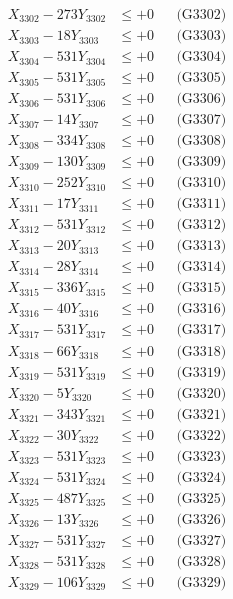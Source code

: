 \documentclass[a4paper,10pt]{article}
\begin{document}
{\begin{align}
X_{3302} - 273Y_{3302} &\leq +0 && \text{(G3302)} \\
X_{3303} - 18Y_{3303} &\leq +0 && \text{(G3303)} \\
X_{3304} - 531Y_{3304} &\leq +0 && \text{(G3304)} \\
X_{3305} - 531Y_{3305} &\leq +0 && \text{(G3305)} \\
X_{3306} - 531Y_{3306} &\leq +0 && \text{(G3306)} \\
X_{3307} - 14Y_{3307} &\leq +0 && \text{(G3307)} \\
X_{3308} - 334Y_{3308} &\leq +0 && \text{(G3308)} \\
X_{3309} - 130Y_{3309} &\leq +0 && \text{(G3309)} \\
X_{3310} - 252Y_{3310} &\leq +0 && \text{(G3310)} \\
\allowbreak
X_{3311} - 17Y_{3311} &\leq +0 && \text{(G3311)} \\
X_{3312} - 531Y_{3312} &\leq +0 && \text{(G3312)} \\
X_{3313} - 20Y_{3313} &\leq +0 && \text{(G3313)} \\
X_{3314} - 28Y_{3314} &\leq +0 && \text{(G3314)} \\
X_{3315} - 336Y_{3315} &\leq +0 && \text{(G3315)} \\
X_{3316} - 40Y_{3316} &\leq +0 && \text{(G3316)} \\
X_{3317} - 531Y_{3317} &\leq +0 && \text{(G3317)} \\
X_{3318} - 66Y_{3318} &\leq +0 && \text{(G3318)} \\
X_{3319} - 531Y_{3319} &\leq +0 && \text{(G3319)} \\
X_{3320} - 5Y_{3320} &\leq +0 && \text{(G3320)} \\
\allowbreak
X_{3321} - 343Y_{3321} &\leq +0 && \text{(G3321)} \\
X_{3322} - 30Y_{3322} &\leq +0 && \text{(G3322)} \\
X_{3323} - 531Y_{3323} &\leq +0 && \text{(G3323)} \\
X_{3324} - 531Y_{3324} &\leq +0 && \text{(G3324)} \\
X_{3325} - 487Y_{3325} &\leq +0 && \text{(G3325)} \\
X_{3326} - 13Y_{3326} &\leq +0 && \text{(G3326)} \\
X_{3327} - 531Y_{3327} &\leq +0 && \text{(G3327)} \\
X_{3328} - 531Y_{3328} &\leq +0 && \text{(G3328)} \\
X_{3329} - 106Y_{3329} &\leq +0 && \text{(G3329)} \\

\end{align}}
\end{document}
